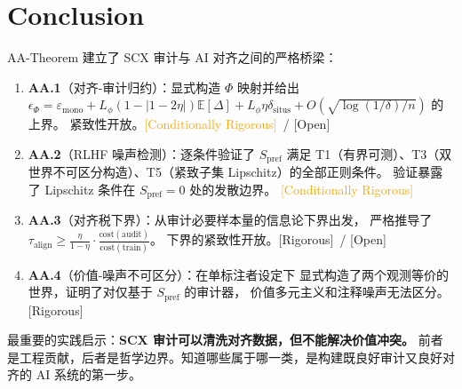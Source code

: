 \documentclass[12pt,a4paper]{article}
\newcommand{\rigorous}{\textcolor{green!50!black}{\small\textsf{[Rigorous]}}}
\newcommand{\conditionallyrigorous}{\textcolor{orange}{\small\textsf{[Conditionally Rigorous]}}}
\newcommand{\openquest}{\textcolor{red!70!black}{\small\textsf{[Open]}}}
\newcommand{\E}{\mathbb{E}}
\begin{document}
\section{Conclusion}

AA-Theorem 建立了 SCX 审计与 AI 对齐之间的严格桥梁：

\begin{enumerate}[label=(\arabic*)]
    \item \textbf{AA.1}（对齐-审计归约）：显式构造 $\Phi$ 映射并给出
          $\epsilon_\Phi = \varepsilon_{\mathrm{mono}} + L_\phi(1-|1-2\eta|)\E[\Delta]
          + L_\phi\eta\delta_{\mathrm{situs}} + O(\sqrt{\log(1/\delta)/n})$ 的上界。
          紧致性开放。\conditionallyrigorous~/ \openquest
    \item \textbf{AA.2}（RLHF 噪声检测）：逐条件验证了 $S_{\mathrm{pref}}$ 满足
          T1（有界可测）、T3（双世界不可区分构造）、T5（紧致子集 Lipschitz）的全部正则条件。
          验证暴露了 Lipschitz 条件在 $S_{\mathrm{pref}}=0$ 处的发散边界。
          \conditionallyrigorous
    \item \textbf{AA.3}（对齐税下界）：从审计必要样本量的信息论下界出发，
          严格推导了 $\tau_{\mathrm{align}} \geq \frac{\eta}{1-\eta}\cdot
          \frac{\mathrm{cost}(\mathrm{audit})}{\mathrm{cost}(\mathrm{train})}$。
          下界的紧致性开放。\rigorous~/ \openquest
    \item \textbf{AA.4}（价值-噪声不可区分）：在单标注者设定下
          显式构造了两个观测等价的世界，证明了对仅基于 $S_{\mathrm{pref}}$ 的审计器，
          价值多元主义和注释噪声无法区分。
          \rigorous
\end{enumerate}

最重要的实践启示：\textbf{SCX 审计可以清洗对齐数据，但不能解决价值冲突。}
前者是工程贡献，后者是哲学边界。知道哪些属于哪一类，是构建既良好审计又良好对齐的
AI 系统的第一步。
\end{document}
